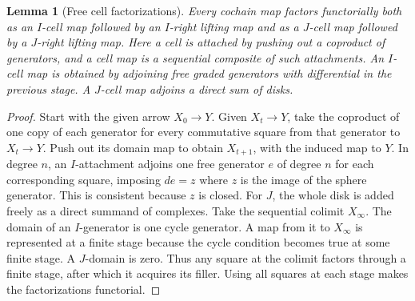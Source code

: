 \documentclass[11pt,oneside,openany]{book}
\newtheorem{lemma}[theorem]{Lemma}
\theoremstyle{definition}
\theoremstyle{remark}
\begin{document}
\begin{lemma}[Free cell factorizations]\label{res:Q11}
Every cochain map factors functorially both as an \(I\)-cell
map followed by an \(I\)-right lifting map and as a \(J\)-cell
map followed by a \(J\)-right lifting map. Here a cell is
attached by pushing out a coproduct of generators, and a
cell map is a sequential composite of such attachments.
An \(I\)-cell map is obtained by adjoining free graded
generators with differential in the previous stage.
A \(J\)-cell map adjoins a direct sum of disks.
\end{lemma}
\begin{proof}
Start with the given arrow \(X_0\to Y\). Given \(X_t\to Y\),
take the coproduct of one copy of each generator for every
commutative square from that generator to \(X_t\to Y\).
Push out its domain map to obtain \(X_{t+1}\), with the
induced map to \(Y\). In degree \(n\), an \(I\)-attachment
adjoins one free generator \(e\) of degree \(n\) for each
corresponding square, imposing \(de=z\) where \(z\) is the
image of the sphere generator. This is consistent because
\(z\) is closed. For \(J\), the whole disk is added freely
as a direct summand of complexes. Take the sequential
colimit \(X_\infty\). The domain of an \(I\)-generator is
one cycle generator. A map from it to \(X_\infty\) is
represented at a finite stage because the cycle condition
becomes true at some finite stage. A \(J\)-domain is zero.
Thus any square at the colimit factors through a finite
stage, after which it acquires its filler. Using all
squares at each stage makes the factorizations functorial.
\end{proof}
\end{document}
